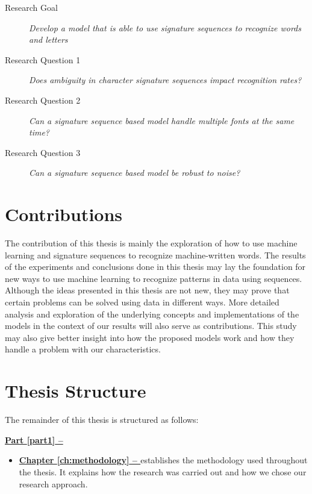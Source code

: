 \begin{description}
    \item[Research Goal]{\textit{Develop a model that is able to use signature sequences to recognize words and letters}}
    \item[Research Question 1]{\textit{Does ambiguity in character signature sequences impact recognition rates?}}
    \item[Research Question 2]{\textit{Can a signature sequence based model handle multiple fonts at the same time?}}
    \item[Research Question 3]{\textit{Can a signature sequence based model be robust to noise?}}
\end{description}


\section{Contributions}
\label{sec:contributions}
The contribution of this thesis is mainly the exploration of how to use machine learning and signature sequences to recognize machine-written words. The results of the experiments and conclusions done in this thesis may lay the foundation for new ways to use machine learning to recognize patterns in data using sequences. Although the ideas presented in this thesis are not new, they may prove that certain problems can be solved using data in different ways. More detailed analysis and exploration of the underlying concepts and implementations of the models in the context of our results will also serve as contributions. This study may also give better insight into how the proposed models work and how they handle a problem with our characteristics.


\section{Thesis Structure}
The remainder of this thesis is structured as follows:

\vspace{0.25cm}\noindent
\textbf{{\hyperref[part1]{Part \ref{part1} -- }}}
\begin{itemize}
    \item\textbf{\hyperref[ch:methodology]{Chapter \ref{ch:methodology} -- }} establishes the methodology used throughout the thesis. It explains how the research was carried out and how we chose our research approach.
\end{itemize}

